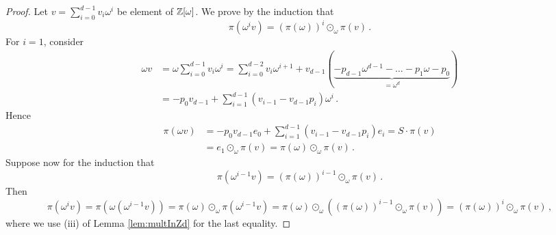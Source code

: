 \begin{proof}
Let $v=\sum_{i=0}^{d-1} v_i \omega^i$ be element of $\mathbb{Z}[\omega]$. We prove by the induction that 
$$
\pi(\omega^{i} v)=(\pi(\omega))^{i}\odot_\omega \pi(v)\,.
$$ 
For $i=1$, consider
\begin{align*}
\omega v&=\omega \sum_{i=0}^{d-1} v_i \omega^i = \sum_{i=0}^{d-2} v_i \omega^{i+1} + v_{d-1}(\underbrace{-p_{d-1}\omega^{d-1}- \dots -p_1\omega-p_0}_{=\omega^d}) \\
&= -p_0 v_{d-1} + \sum_{i=1}^{d-1} (v_{i-1}- v_{d-1} p_i) \omega^i\,.
\end{align*}
Hence
\begin{align*}
\pi(\omega v)&= -p_0 v_{d-1} e_0 + \sum_{i=1}^{d-1} (v_{i-1}- v_{d-1} p_i) e_i = S \cdot \pi(v) \\
    &=e_1\odot_\omega \pi(v)=\pi(\omega)\odot_\omega\pi(v)\,.
\end{align*}
Suppose now for the induction that
$$
\pi(\omega^{i-1} v)=(\pi(\omega))^{i-1}\odot_\omega \pi(v)\,.
$$ 
Then
$$
\pi(\omega^{i}v)=\pi(\omega(\omega^{i-1} v))=\pi(\omega)\odot_\omega\pi(\omega^{i-1} v)=\pi(\omega)\odot_\omega\left((\pi(\omega))^{i-1}\odot_\omega \pi(v)\right)=(\pi(\omega))^{i}\odot_\omega \pi(v)\,,
$$
where we use (iii) of Lemma \ref{lem:multInZd} for the last equality.


\end{proof}
